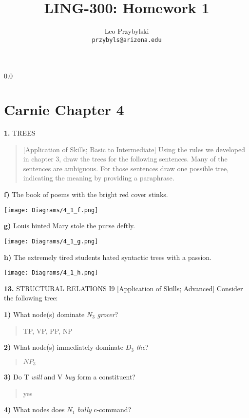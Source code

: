 \documentclass[11pt,notitlepage]{article}
\title{LING-300: Homework 1}
\author{Leo Przybylski\\
\texttt{przybyls@arizona.edu}}
\newcommand{\question}[2]{\textbf{#1.} #2}
\newcommand{\subquestion}[2]{\par\hspace{0.5cm} \textbf{#1)} #2}
\begin{document}
  \maketitle
  {\setlength{\baselineskip}%
           {0.0\baselineskip}
  \section*{Carnie Chapter 4}
  \hrulefill \par}

\question{1}{TREES}
\begin{quote}
[Application of Skills; Basic to Intermediate]
Using the rules we developed in chapter 3, draw the trees for the
following sentences. Many of the sentences are ambiguous. For those
sentences draw one possible tree, indicating the meaning by providing
a paraphrase.
\end{quote}


\subquestion{f}{The book of poems with the bright red cover stinks.}

\texttt{[image: Diagrams/4\_1\_f.png]}

\subquestion{g}{Louis hinted Mary stole the purse deftly.}

\texttt{[image: Diagrams/4\_1\_g.png]}

\subquestion{h}{The extremely tired students hated syntactic trees with a passion.}

\texttt{[image: Diagrams/4\_1\_h.png]}


\question{13}{STRUCTURAL RELATIONS I9 [Application of Skills; Advanced] Consider the following tree:}

\subquestion{1}{What node(s) dominate $N_3$ \emph{grocer}?}

\begin{quote}
  TP, VP, PP, NP
\end{quote}

\subquestion{2}{What node(s) immediately dominate $D_3$ \emph{the}?}

\begin{quote}
  $NP_3$
\end{quote}

\subquestion{3}{Do T \emph{will} and V \emph{buy} form a constituent?}

\begin{quote}
  yes
\end{quote}

\subquestion{4}{What nodes does $N_1$ \emph{bully} c-command?}
\end{document}
